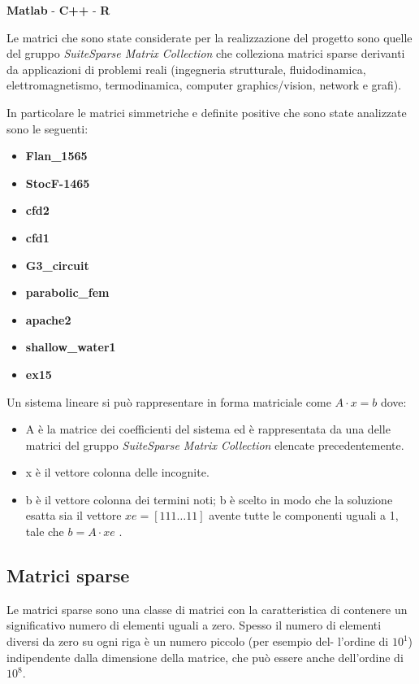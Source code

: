 \documentclass[preprint,12pt]{elsarticle}
\begin{document}
\begin{center}
	\textbf{Matlab} \quad - \quad \textbf{C++} \quad - \quad \textbf{R}
\end{center}

Le matrici che sono state considerate per la realizzazione del progetto sono quelle del gruppo \textit{SuiteSparse Matrix Collection} che colleziona matrici sparse derivanti da applicazioni di problemi reali (ingegneria strutturale, fluidodinamica, elettromagnetismo, termodinamica, computer graphics/vision, network e grafi).

In particolare le matrici simmetriche e definite positive che sono state analizzate sono le seguenti:
\begin{center}
	\begin{itemize}
		\item \textbf{Flan\_1565}
		\item \textbf{StocF-1465}
		\item \textbf{cfd2}
		\item \textbf{cfd1}
		\item \textbf{G3\_circuit}
		\item \textbf{parabolic\_fem}
		\item \textbf{apache2}
		\item \textbf{shallow\_water1}
		\item \textbf{ex15}
	\end{itemize}
	
\end{center}

Un sistema lineare si può rappresentare in forma matriciale come $ A \cdot x = b $
dove:
\begin{itemize}
	\item A è la matrice dei coefficienti del sistema ed è rappresentata da una delle matrici del gruppo \textit{SuiteSparse Matrix Collection} elencate precedentemente.
	\item x è il vettore colonna delle incognite.
	\item b è il vettore colonna dei termini noti; b è scelto in modo che la soluzione esatta sia il vettore $ xe = [1 1 1 \dots 1 1] $ avente tutte le componenti uguali a 1, tale che $ b = A \cdot xe $ .
\end{itemize}


\subsection{Matrici sparse}
Le matrici sparse sono una classe di matrici con la caratteristica di contenere un significativo numero di elementi uguali a zero. Spesso il numero di elementi diversi da zero su ogni riga è un numero piccolo (per esempio del- l’ordine di $10^1$) indipendente dalla dimensione della matrice, che può essere anche dell’ordine di $10^8$.
\end{document}
